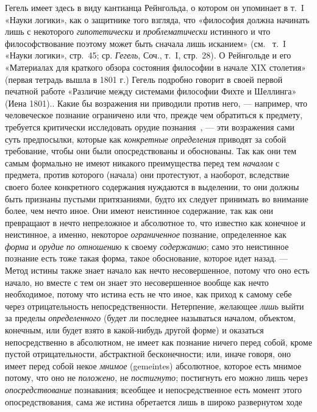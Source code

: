 \documentclass[twoside]{article}
\begin{document}
{{{Гегель имеет здесь в виду кантианца
Рейнгольда, о котором он упоминает в т.~I «Науки логики», как о защитнике
того взгляда, что «философия должна начинать лишь с некоторого 
{\em гипотетически} и {\em проблематически}
истинного и что философствование поэтому может быть сначала
лишь исканием» (см. \ т.~I «Науки логики», стр.~45; ср.
{\em Гегель},
Соч., т.~I, стр.~28). О Рейнгольде и его «Материалах для
краткого обзора состояния философии в начале XIX столетия» (первая тетрадь
вышла в 1801 г.) Гегель подробно говорит в своей первой печатной работе
«Различие между системами философии Фихте и Шеллинга» (Иена 1801).}\label{bkm:bm129}.
Какие бы возражения ни приводили против него, —
например, что человеческое познание ограничено или что,
прежде чем обратиться к предмету, требуется критически исследовать орудие
познания~\label{bkm:bm130},
— эти возражения сами суть предпосылки, которые как
{\em конкретные определения}
приводят за собой требование, чтобы они были опосредствованы
и обоснованы. Так как они тем самым формально не имеют никакого
преимущества перед тем {\em началом}
с предмета, против которого (начала) они протестуют, а
наоборот, вследствие своего более конкретного содержания нуждаются в
выделении, то они должны быть признаны пустыми притязаниями, будто их
следует принимать во внимание более, чем нечто иное. Они имеют
неистинное содержание, так как они превращают в нечто непреложное и
абсолютное то, что известно как конечное и неистинное, а именно, некоторое
{\em ограниченное}
познание, определенное как
{\em форма} и
{\em орудие}
{\em по отношению} к
своему {\em содержанию};
само это неистинное познание есть тоже такая форма, такое
обоснование, которое идет назад. — Метод истины также знает
начало как нечто несовершенное, потому что оно есть начало, но вместе с тем
он знает это несовершенное вообще как нечто необходимое,
потому что истина есть не что иное, как приход к самому себе через
отрицательность непосредственности. Нетерпение, желающее
{\em лишь} выйти за
пределы {\em определенного}
(будет ли последнее называться началом, объектом, конечным,
или будет взято в какой-нибудь другой форме) и оказаться непосредственно в
абсолютном, не имеет как познание ничего перед собой, кроме пустой
отрицательности, абстрактной бесконечности; или, иначе говоря, оно имеет
перед собой некое {\em мнимое}
(gemeintes) абсолютное, которое есть мнимое потому, что оно
не {\em положено}, не
{\em постигнуто};
постигнуть его можно лишь через
{\em опосредствование}
познавания; всеобщее и непосредственное есть момент этого
опосредствования, сама же истина обретается лишь в широко развернутом ходе
}}
\end{document}
